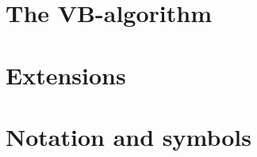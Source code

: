 \documentclass[11pt,letterpaper,twocolumn]{article}
\begin{document}
\section{The VB-algorithm}

\section{Extensions}

\section{Notation and symbols}\label{sec:notation}

\clearpage
{}

\end{document}

